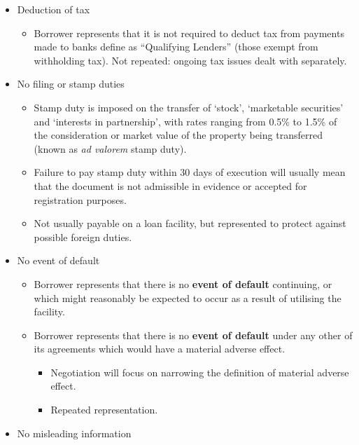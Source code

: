 \documentclass[
]{article}
\providecommand{\tightlist}{%
  \setlength{\itemsep}{0pt}\setlength{\parskip}{0pt}}
\begin{document}
\begin{itemize}
\tightlist
\item
  Deduction of tax

  \begin{itemize}
  \tightlist
  \item
    Borrower represents that it is not required to deduct tax from
    payments made to banks define as ``Qualifying Lenders'' (those
    exempt from withholding tax). Not repeated: ongoing tax issues dealt
    with separately.
  \end{itemize}
\item
  No filing or stamp duties

  \begin{itemize}
  \tightlist
  \item
    Stamp duty is imposed on the transfer of `stock', `marketable
    securities' and `interests in partnership', with rates ranging from
    0.5\% to 1.5\% of the consideration or market value of the property
    being transferred (known as \emph{ad valorem} stamp duty).
  \item
    Failure to pay stamp duty within 30 days of execution will usually
    mean that the document is not admissible in evidence or accepted for
    registration purposes.
  \item
    Not usually payable on a loan facility, but represented to protect
    against possible foreign duties.
  \end{itemize}
\item
  No event of default

  \begin{itemize}
  \tightlist
  \item
    Borrower represents that there is no \textbf{event of default}
    continuing, or which might reasonably be expected to occur as a
    result of utilising the facility.
  \item
    Borrower represents that there is no \textbf{event of default} under
    any other of its agreements which would have a material adverse
    effect.

    \begin{itemize}
    \tightlist
    \item
      Negotiation will focus on narrowing the definition of material
      adverse effect.
    \item
      Repeated representation.
    \end{itemize}
  \end{itemize}
\item
  No misleading information


\end{itemize}
\end{document}
